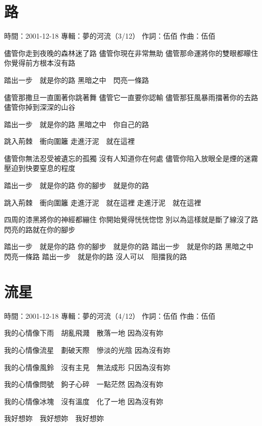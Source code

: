 \documentclass[UTF8,a4paper,oneside,twocolumn,12pt]{ctexbook}
\newcommand{\infopair}[2]{\textbullet #1：#2}
\newcommand{\zc}[1][伍佰]{\infopair{作詞}{#1}}
\newcommand{\zq}[1][伍佰]{\infopair{作曲}{#1}}
\newcommand{\zj}[1]{\infopair{專輯}{#1}}
\newcommand{\sj}[1]{\infopair{時間}{#1}}
\newenvironment{info}{\begin{flushleft}\kaishu
	}
	{\end{flushleft}\normalsize\yahei\par}
\newenvironment{lyric}{
	}
{}
\begin{document}
\section{路}
\begin{info}
	\sj{2001-12-18}
	\zj{夢的河流（3/12）}
	\zc
	\zq
\end{info}
\begin{lyric}
	儘管你走到夜晚的森林迷了路
	儘管你現在非常無助
	儘管那命運將你的雙眼都矇住
	你覺得前方根本沒有路

	踏出一步　就是你的路
	黑暗之中　閃亮一條路

	儘管那撒旦一直圍著你跳著舞
	儘管它一直要你認輸
	儘管那狂風暴雨擋著你的去路
	儘管你掉到深深的山谷

	踏出一步　就是你的路
	黑暗之中　你自己的路

	跳入荊棘　衝向圍籬
	走進汙泥　就在這裡

	儘管你無法忍受被遺忘的孤獨
	沒有人知道你在何處
	儘管你陷入放眼全是煙的迷霧
	壓迫到快要窒息的程度

	踏出一步　就是你的路
	你的腳步　就是你的路

	跳入荊棘　衝向圍籬
	走進汙泥　就在這裡
	走進汙泥　就在這裡

	四周的漆黑將你的神經都繃住
	你開始覺得恍恍惚惚
	別以為這樣就是斷了線沒了路
	閃亮的路就在你的腳步

	踏出一步　就是你的路
	你的腳步　就是你的路
	踏出一步　就是你的路
	黑暗之中　閃亮一條路
	踏出一步　就是你的路
	沒人可以　阻擋我的路
\end{lyric}

\section{流星}
\begin{info}
	\sj{2001-12-18}
	\zj{夢的河流（4/12）}
	\zc
	\zq
\end{info}
\begin{lyric}
	我的心情像下雨　胡亂飛濺　散落一地
	因為沒有妳

	我的心情像流星　劃破天際　慘淡的光陰
	因為沒有妳

	我的心情像風鈴　沒有主見　無法成形
	只因為沒有妳

	我的心情像問號　鉤子心碎　一點茫然
	因為沒有妳

	我的心情像冰塊　沒有溫度　化了一地
	因為沒有妳

	我好想妳　我好想妳　我好想妳
\end{lyric}
\end{document}
